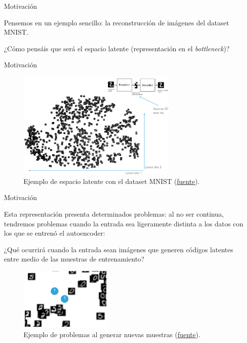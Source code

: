 \begin{frame}{Motivación}

Pensemos en un ejemplo sencillo: la reconstrucción de imágenes del dataset MNIST.

¿Cómo pensáis que será el espacio latente (representación en el \textit{bottleneck})?

\end{frame}

\begin{frame}{Motivación}

\begin{figure}
    \centering
    \includegraphics[width=0.7\textwidth]{Slides/figures/02_Metodos_Generativos/ae-latent-space.png}
    \caption{Ejemplo de espacio latente con el dataset MNIST (\href{https://indico.ictp.it/event/8674/session/155/contribution/1121/material/slides/0.pdf}{fuente}).}
    \label{fig:enter-label}
\end{figure}

\end{frame}

\begin{frame}{Motivación}

Esta representación presenta determinados problemas: al no ser continua, tendremos problemas cuando la entrada sea ligeramente distinta a los datos con los que se entrenó el autoencoder:

¿Qué ocurrirá cuando la entrada sean imágenes que generen códigos latentes entre medio de las muestras de entrenamiento?

\begin{figure}
    \centering
    \includegraphics[width=0.4\textwidth]{Slides/figures/02_Metodos_Generativos/ae-zoom-latent-space.png}
    \caption{Ejemplo de problemas al generar nuevas muestras (\href{https://indico.ictp.it/event/8674/session/155/contribution/1121/material/slides/0.pdf}{fuente}).}
    \label{fig:enter-label}
\end{figure}

\end{frame}


